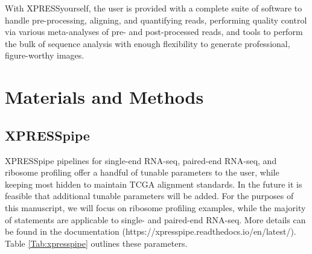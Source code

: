 \documentclass[11pt, a4paper, oneside]{article}
\begin{document}
With XPRESSyourself, the user is provided with a complete suite of software to handle pre-processing, aligning, and quantifying reads, performing quality control via various meta-analyses of pre- and post-processed reads, and tools to perform the bulk of sequence analysis with enough flexibility to generate professional, figure-worthy images.

\section{Materials and Methods}

\subsection{XPRESSpipe}
XPRESSpipe pipelines for single-end RNA-seq, paired-end RNA-seq, and ribosome profiling offer a handful of tunable parameters to the user, while keeping most hidden to maintain TCGA alignment standards. In the future it is feasible that additional tunable parameters will be added. For the purposes of this manuscript, we will focus on ribosome profiling examples, while the majority of statements are applicable to single- and paired-end RNA-seq. More details can be found in the documentation (https://xpresspipe.readthedocs.io/en/latest/). Table \ref{Tab:xpresspipe} outlines these parameters.
\end{document}
